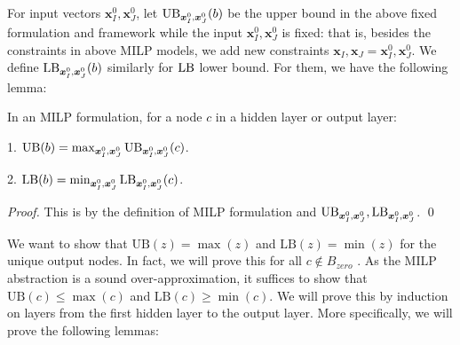 			
			
			
			For input vectors $\boldsymbol{x}^0_I,\boldsymbol{x}^0_J$, let $\mathrm{UB}_{\boldsymbol{x}^0_I,\boldsymbol{x}^0_J}(b)$ be the upper bound in the above fixed formulation and framework while the input $\boldsymbol{x}^0_I,\boldsymbol{x}^0_J$ is fixed: that is, besides the constraints in above MILP models, we add new constraints $\boldsymbol{x}_I,\boldsymbol{x}_J=\boldsymbol{x}^0_I,\boldsymbol{x}^0_J$. We  define $\mathrm{LB}_{\boldsymbol{x}^0_I,\boldsymbol{x}^0_J}(b)$ similarly for $\mathrm{LB}$ lower bound. For them, we have the following lemma:
			
			\begin{lemma} In an MILP formulation, for a node $c$ in a hidden layer or output layer:
				
				1. $\mathrm{UB}(b)=\max_{\boldsymbol{x}^0_I,\boldsymbol{x}^0_J}\mathrm{UB}_{\boldsymbol{x}^0_I,\boldsymbol{x}^0_J}(c)$. 
				
				2. $\mathrm{LB}(b)=\min_{\boldsymbol{x}^0_I,\boldsymbol{x}^0_J}\mathrm{LB}_{\boldsymbol{x}^0_I,\boldsymbol{x}^0_J}(c)$. 
			\end{lemma}
			
			\begin{proof}
				This is by the definition of MILP formulation and $\mathrm{UB}_{\boldsymbol{x}^0_I,\boldsymbol{x}^0_J}, \mathrm{LB}_{\boldsymbol{x}^0_I,\boldsymbol{x}^0_J}$. \qed
			\end{proof}
			
	
			
			
			We want to show that $\mathrm{UB}(z) = \max (z)$ and $\mathrm{LB}(z) = \min (z)$ for the unique output nodes. In fact, we will prove this for all $c\notin B_{zero}$ . As the MILP abstraction is a sound over-approximation, 
			it suffices to show that $\mathrm{UB}(c)\leq \max (c)$ and $\mathrm{LB}(c) \geq \min (c)$. We will prove this by induction on layers from the first hidden layer to the output layer. More specifically, we will prove the following lemmas:
			
